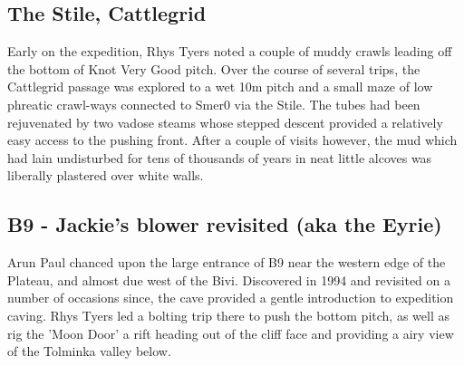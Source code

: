 \subsection{The Stile, Cattlegrid}
Early on the expedition, Rhys Tyers noted a couple of muddy crawls leading off the bottom of Knot Very Good pitch. Over the course of several trips, the Cattlegrid passage was explored to a wet 10m pitch and a small maze of low phreatic crawl-ways connected to Smer0 via the Stile. The tubes had been rejuvenated by two vadose steams whose stepped descent provided a relatively easy access to the pushing front. After a couple of visits however, the mud which had lain undisturbed for tens of thousands of years in neat little alcoves was liberally plastered over white walls.

\subsection{B9 - Jackie's blower revisited (aka the Eyrie)}
Arun Paul chanced upon the large entrance of B9 near the western edge of the Plateau, and almost due west of the Bivi. Discovered in 1994 and revisited on a number of occasions since, the cave provided a gentle introduction to expedition caving. Rhys Tyers led a bolting trip there to push the bottom pitch, as well as rig the 'Moon Door' a rift heading out of the cliff face and providing a airy view of the Tolminka valley below.

